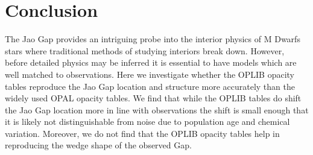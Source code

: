 \section{Conclusion}\label{sec:conclusion}
The Jao Gap provides an intriguing probe into the interior physics of M Dwarfs
stars where traditional methods of studying interiors break down. However,
before detailed physics may be inferred it is essential to have models which
are well matched to observations. Here we investigate whether the OPLIB opacity
tables reproduce the Jao Gap location and structure more accurately than the
widely used OPAL opacity tables. We find that while the OPLIB tables do shift
the Jao Gap location more in line with observations the shift is small enough
that it is likely not distinguishable from noise due to population age and
chemical variation. Moreover, we do not find that the OPLIB opacity tables help
in reproducing the wedge shape of the observed Gap.
